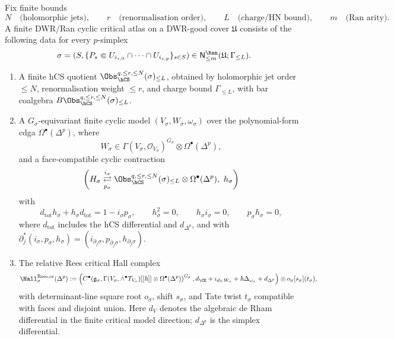 \begin{definition}
\label{def:finite-dwr-ran-cyclic-critical-atlas}
Fix finite bounds
\[
 N\quad\text{(holomorphic jets)},\qquad
 r\quad\text{(renormalisation order)},\qquad
 L\quad\text{(charge/HN bound)},\qquad
 m\quad\text{(Ran arity)}.
\]
A finite DWR/Ran cyclic critical atlas on a DWR-good cover
$\mathfrak U$ consists of the following data for every
$p$-simplex
\[
 \sigma=(S,\{P_s\Subset U_{i_{s,0}}\cap\cdots\cap
 U_{i_{s,p}}\}_{s\in S})
 \in \mathsf N^{\Ran}_{\leq m}(\mathfrak U;\Gamma_{\leq L}).
\]

\begin{enumerate}
\item A finite hCS quotient
$\Obs_{\hCS}^{q,\leq r,\leq N}(\sigma)_{\leq L}$, obtained by
holomorphic jet order $\leq N$, renormalisation weight $\leq r$, and
charge bound $\Gamma_{\leq L}$, with bar coalgebra
$B\Obs_{\hCS}^{q,\leq r,\leq N}(\sigma)_{\leq L}$.
\item A $G_\sigma$-equivariant finite cyclic model
$(V_\sigma,W_\sigma,\omega_\sigma)$ over the polynomial-form cdga
$\Omega^\bullet(\Delta^p)$, where
\[
 W_\sigma\in
 \Gamma(V_\sigma,\mathcal O_{V_\sigma})^{G_\sigma}
 \otimes \Omega^\bullet(\Delta^p),
\]
and a face-compatible cyclic contraction
\[
\left(
 H_\sigma
 \underset{p_\sigma}{\stackrel{i_\sigma}{\rightleftarrows}}
 \Obs_{\hCS}^{q,\leq r,\leq N}(\sigma)_{\leq L}
 \otimes\Omega^\bullet(\Delta^p),
 \ h_\sigma
\right)
\]
with
\[
 d_{\mathrm{tot}}h_\sigma+h_\sigma d_{\mathrm{tot}}
 =1-i_\sigma p_\sigma,\qquad
 h_\sigma^2=0,\qquad
 h_\sigma i_\sigma=0,\qquad
 p_\sigma h_\sigma=0,
\]
where $d_{\mathrm{tot}}$ includes the hCS differential and
$d_{\Delta^p}$, and with
$\partial_j^*(i_\sigma,p_\sigma,h_\sigma)=
(i_{\partial_j\sigma},p_{\partial_j\sigma},h_{\partial_j\sigma})$.
\item The relative Rees critical Hall complex
\[
 \Hall_{\sigma}^{\mathrm{Rees},\mathrm{or}}(\Delta^p)
 :=
 \left(
 C^\bullet\!\left(
 \mathfrak g_\sigma,
 \Gamma(V_\sigma,\wedge^\bullet T_{V_\sigma})[[\hbar]]
 \otimes\Omega^\bullet(\Delta^p)
 \right)^{G_\sigma},
 d_{\CE}+\iota_{d_VW_\sigma}
 +\hbar\Delta_{\omega_\sigma}+d_{\Delta^p}
 \right)
 \otimes o_\sigma[s_\sigma](t_\sigma),
\]
with determinant-line square root $o_\sigma$, shift $s_\sigma$, and
Tate twist $t_\sigma$ compatible with faces and disjoint union. Here
$d_V$ denotes the algebraic de Rham differential in the finite critical
model direction; $d_{\Delta^p}$ is the simplex differential.
\end{enumerate}


\end{definition}
